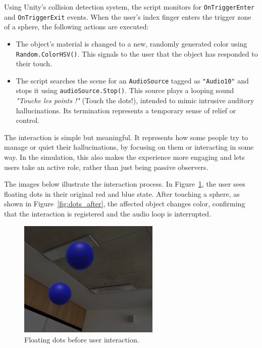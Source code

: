 \vspace{1em}

Using Unity's collision detection system, the script monitors for \texttt{OnTriggerEnter} and \texttt{OnTriggerExit} events. When the user's index finger enters the trigger zone of a sphere, the following actions are executed:

\begin{itemize}
    \item The object's material is changed to a new, randomly generated color using \texttt{Random.ColorHSV()}. This signals to the user that the object has responded to their touch.
    \item The script searches the scene for an \texttt{AudioSource} tagged as \texttt{"Audio10"} and stops it using \texttt{audioSource.Stop()}. This source plays a looping sound \textit{"Touche les points !"} (Touch the dots!), intended to mimic intrusive auditory hallucinations. Its termination represents a temporary sense of relief or control.
\end{itemize}

The interaction is simple but meaningful. It represents how some people try to manage or quiet their hallucinations, by focusing on them or interacting in some way. In the simulation, this also makes the experience more engaging and lets users take an active role, rather than just being passive observers.

\vspace{1em}

The images below illustrate the interaction process. In Figure~\ref{fig:dots_before}, the user sees floating dots in their original red and blue state. After touching a sphere, as shown in Figure~\ref{fig:dots_after}, the affected object changes color, confirming that the interaction is registered and the audio loop is interrupted.

\begin{figure}[H]
    \centering
    \includegraphics[width=0.6\textwidth]{../../Figures/dots-video.jpg}
    \caption{Floating dots before user interaction.}
    \label{fig:dots_before}
\end{figure}

